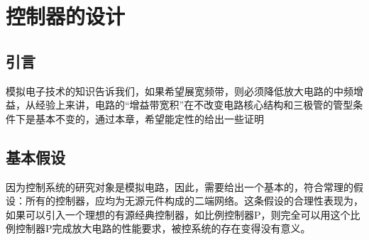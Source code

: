 \documentclass[UTF8,a4paper]{paper}
\begin{document}
\section{控制器的设计}
\subsection{引言}
模拟电子技术的知识告诉我们，如果希望展宽频带，则必须降低放大电路的中频增益，从经验上来讲，电路的“增益带宽积”在不改变电路核心结构和三极管的管型条件下是基本不变的，通过本章，希望能定性的给出一些证明
\subsection{基本假设}
因为控制系统的研究对象是模拟电路，因此，需要给出一个基本的，符合常理的假设：所有的控制器，应均为无源元件构成的二端网络。这条假设的合理性表现为，如果可以引入一个理想的有源经典控制器，如比例控制器P，则完全可以用这个比例控制器P完成放大电路的性能要求，被控系统的存在变得没有意义。
\end{document}
